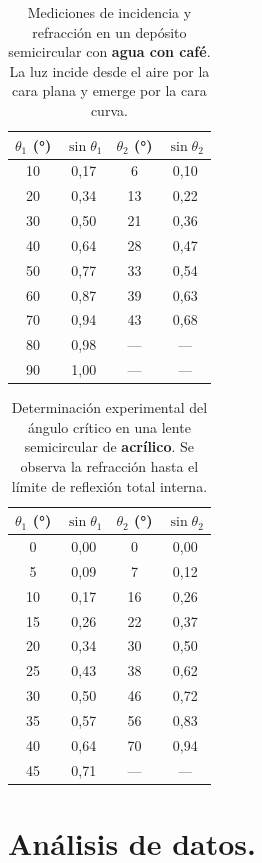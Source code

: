 \documentclass[11pt,twocolumn]{article}
\begin{document}
\begin{table}[H]
\centering
\caption{Mediciones de incidencia y refracción en un depósito semicircular con \textbf{agua con café}. 
La luz incide desde el aire por la cara plana y emerge por la cara curva.}
\label{tab:cafe_plana_curva}
\begin{tabular}{|c|c|c|c|}
\hline
$\theta_{1}$ (°) & $\sin\theta_{1}$ & $\theta_{2}$ (°) & $\sin\theta_{2}$ \\ \hline
10 & 0,17 & 6 & 0,10 \\
20 & 0,34 & 13 & 0,22 \\
30 & 0,50 & 21 & 0,36 \\
40 & 0,64 & 28 & 0,47 \\
50 & 0,77 & 33 & 0,54 \\
60 & 0,87 & 39 & 0,63 \\
70 & 0,94 & 43 & 0,68 \\
80 & 0,98 & --- & --- \\
90 & 1,00 & --- & --- \\ \hline
\end{tabular}
\end{table}

\begin{table}[H]
\centering
\caption{Determinación experimental del ángulo crítico en una lente semicircular de \textbf{acrílico}. 
Se observa la refracción hasta el límite de reflexión total interna.}
\label{tab:acrilico}
\begin{tabular}{|c|c|c|c|}
\hline
$\theta_{1}$ (°) & $\sin\theta_{1}$ & $\theta_{2}$ (°) & $\sin\theta_{2}$ \\ \hline
0 & 0,00 & 0 & 0,00 \\
5 & 0,09 & 7 & 0,12 \\
10 & 0,17 & 16 & 0,26 \\
15 & 0,26 & 22 & 0,37 \\
20 & 0,34 & 30 & 0,50 \\
25 & 0,43 & 38 & 0,62 \\
30 & 0,50 & 46 & 0,72 \\
35 & 0,57 & 56 & 0,83 \\
40 & 0,64 & 70 & 0,94 \\
45 & 0,71 & --- & --- \\ \hline
\end{tabular}
\end{table}

\section{Análisis de datos.}
\end{document}
